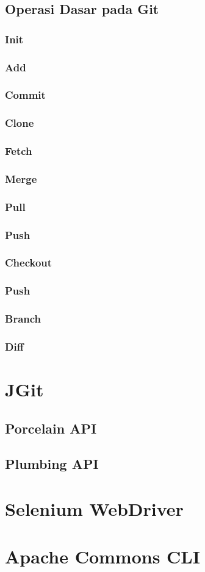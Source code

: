 \subsection{Operasi Dasar pada Git}
\subsubsection{Init}
\subsubsection{Add}
\subsubsection{Commit}
\subsubsection{Clone}
\subsubsection{Fetch}
\subsubsection{Merge}
\subsubsection{Pull}
\subsubsection{Push}
\subsubsection{Checkout}
\subsubsection{Push}
\subsubsection{Branch}
\subsubsection{Diff}

\section{JGit}
\subsection{Porcelain API}
\subsection{Plumbing API}

\section{Selenium WebDriver}


\section{Apache Commons CLI}
